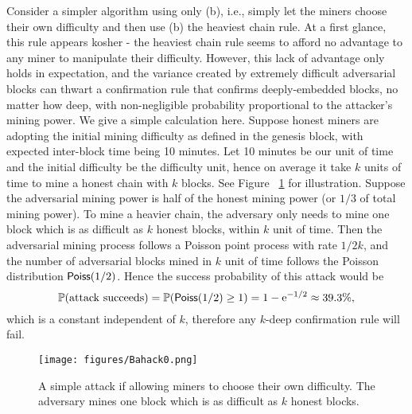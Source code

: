 \documentclass{article}
\begin{document}
Consider a simpler algorithm using only (b), i.e., simply let the miners choose their own difficulty and then use (b) the heaviest chain rule. At a first glance, this rule appears kosher - the heaviest chain rule seems to afford no advantage to any miner to manipulate their difficulty. However, this lack of advantage only holds in expectation, and the variance created by extremely difficult adversarial blocks can thwart a confirmation rule that confirms deeply-embedded blocks, no matter how deep, with non-negligible probability proportional to the attacker's mining power. We give a simple calculation here. Suppose honest miners are adopting the initial mining difficulty as defined in the genesis block, with expected inter-block time being 10 minutes. Let 10 minutes be our unit of time and the initial difficulty be the difficulty unit, hence on average it take $k$ units of time to mine a honest chain with $k$ blocks. See Figure ~\ref{fig:bahack0} for illustration. Suppose the adversarial mining power is half of the honest mining power (or $1/3$ of total mining power). To mine a heavier chain, the adversary only needs to mine one block which is as difficult as $k$ honest blocks, within $k$ unit of time. Then the adversarial mining process follows a Poisson point process with rate $1/2k$, and the number of adversarial blocks mined in $k$ unit of time follows the Poisson distribution ${\sf Poiss}(1/2)$. Hence the success probability of this attack would be
$$\mathbb{P}(\rm attack~succeeds) = \mathbb{P}({\sf Poiss}(1/2)\geq 1) = 1 - e^{-1/2} \approx 39.3\%,$$
which is a constant independent of $k$, therefore any $k$-deep confirmation rule will fail.

\begin{figure}
    \centering
    \texttt{[image: figures/Bahack0.png]}
    \caption{A simple attack if allowing miners to choose their own difficulty. The adversary mines one block which is as difficult as $k$ honest blocks.}
    \label{fig:bahack0}
\end{figure}
\end{document}
